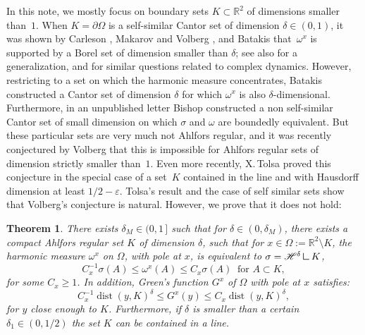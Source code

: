\documentclass[JEP,XML,SOM,Unicode,published]{cedram}
\let\sm\setminus
\numberwithin{equation}{section}
\theoremstyle{plain}
\newtheorem{thm}[lem]{Theorem}
\theoremstyle{definition}
\newcommand{\R}{\mathbb{R}}
\let\sm\setminus
\DeclareMathOperator{\dist}{dist}
\newcommand{\R}{\mathbb{R}}
\renewcommand{\d}{\partial}
\DeclareMathOperator{\dist}{dist}
\newcommand{\mres}{\mathbin{\vrule height 1.6ex depth 0pt width
0.13ex\vrule height 0.13ex depth 0pt width 1.3ex}}
\begin{document}
In this note, we mostly
focus on boundary sets $K \!\subset\! \R^2$ of dimensions smaller than~$1$.
When $K = \d\Omega$ is a self-similar Cantor set of dimension $\delta\in (0,1)$, it
was shown by Carleson \cite{Carleson1985},
Makarov and Volberg \cite{MakarovVolberg1986},
and Batakis \cite{Batakis1996} that~$\omega^x$ is supported by a Borel set of dimension smaller than $\delta$;
see also \cite{BatakisZdunik2015} for a generalization, and
\cite{Volberg1992, Volberg1993, Zdunik1997} for similar questions related to complex dynamics.
However, restricting to a set on which the harmonic measure concentrates, Batakis constructed a Cantor set
of dimension $\delta$ for which $\omega^x$ is also $\delta$-dimensional.
Furthermore, in an unpublished letter Bishop constructed a non self-similar Cantor set of small dimension
on which $\sigma$ and $\omega$ are boundedly equivalent.
But these particular sets are very much not Ahlfors regular, and it
was recently conjectured by Volberg \cite[Conj.\,1.9]{Volberg2022onephase}
that this is impossible for Ahlfors regular sets of dimension strictly smaller than~$1$.
Even more recently, X.\,Tolsa \cite{Tolsa2023ADreg} proved this conjecture in the special case of a set~$K$ contained in the line and with Hausdorff dimension at least $1/2-\varepsilon$.
Tolsa's result and the case of self similar sets show that Volberg's conjecture is natural.
However, we prove that it does not hold:

\begin{thm}\label{thm:main}
There exists $\delta_M\in (0,1\,]$ such that for $\delta\in (0,\delta_M)$, there exists a compact Ahlfors regular set $K$ of dimension $\delta$, such that for $x\in \Omega := \R^2 \sm K$,
the harmonic measure $\omega^x$ on $\Omega$, with pole at $x$, is
equivalent to $\sigma = \mathscr{H}^\delta \mres K$, \ie
\begin{equation} \label{eq:measures-eq}
C_x^{-1} \sigma(A) \leq \omega^x(A) \leq C_x \sigma(A)
\ \text{ for } A\subset K,
\end{equation}
for some $C_x \geq 1$.
In addition, Green's function $G^x$ of $\Omega$ with pole at $x$ satisfies:
\begin{equation}\label{eq:green-dist}
C_x^{-1} \dist(y,K)^\delta \leq G^x(y) \leq C_x \dist(y,K)^\delta,
\end{equation}
for $y$ close enough to $K$.
Furthermore, if $\delta$ is smaller than a certain $\delta_1 \in (0,1/2)$
the set $K$ can be contained in a line.
\end{thm}
\end{document}
